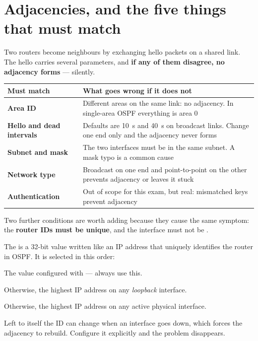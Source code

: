 \section{Adjacencies, and the five things that must match}

Two routers become neighbours by exchanging hello packets on a shared link. The
hello carries several parameters, and \textbf{if any of them disagree, no
adjacency forms} --- silently.

\begin{longtable}{@{}L{4.0cm}L{11.2cm}@{}}
\toprule
{}
\textbf{Must match} & \textbf{What goes wrong if it does not} \\
\midrule
\endhead
\textbf{Area ID} & Different areas on the same link: no adjacency. In single-area
OSPF everything is area 0 \\
\textbf{Hello and dead intervals} & Defaults are 10~s and 40~s on broadcast
links. Change one end only and the adjacency never forms \\
\textbf{Subnet and mask} & The two interfaces must be in the same subnet. A mask
typo is a common cause \\
\textbf{Network type} & Broadcast on one end and point-to-point on the other
prevents adjacency or leaves it stuck \\
\textbf{Authentication} & Out of scope for this exam, but real: mismatched keys
prevent adjacency \\
\bottomrule
\end{longtable}

Two further conditions are worth adding because they cause the same symptom: the
\textbf{router IDs must be unique}, and the interface must not be
.

\begin{definitionbox}
The  is a 32-bit value written like an IP address that uniquely
identifies the router in OSPF. It is selected in this order:
\begin{tightnum}
  \item The value configured with  --- always use this.
  \item Otherwise, the highest IP address on any \emph{loopback} interface.
  \item Otherwise, the highest IP address on any active physical interface.
\end{tightnum}
Left to itself the ID can change when an interface goes down, which forces the
adjacency to rebuild. Configure it explicitly and the problem disappears.
\end{definitionbox}


